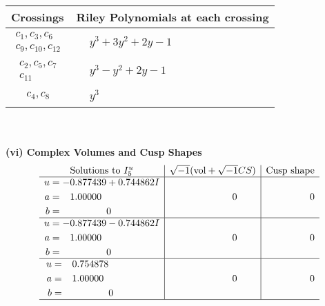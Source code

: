 \documentclass[1p]{elsarticle_modified}
\theoremstyle{definition}
\newcommand{\I}{\sqrt{-1}}
\begin{document}
\begin{tabular}{m{50pt}|m{274pt}}
Crossings & \hspace{64pt}Riley Polynomials at each crossing \\
\hline $$\begin{aligned}c_{1},c_{3},c_{6}\\c_{9},c_{10},c_{12}\end{aligned}$$&$\begin{aligned}
&y^3+3 y^2+2 y-1
\end{aligned}$\\
\hline $$\begin{aligned}c_{2},c_{5},c_{7}\\c_{11}\end{aligned}$$&$\begin{aligned}
&y^3- y^2+2 y-1
\end{aligned}$\\
\hline $$\begin{aligned}c_{4},c_{8}\end{aligned}$$&$\begin{aligned}
&y^3
\end{aligned}$\\
\hline
\end{tabular}\\~\\
\newpage\flushleft \textbf{(vi) Complex Volumes and Cusp Shapes}
$$\begin{array}{c|c|c}  
\text{Solutions to }I^u_{5}& \I (\text{vol} + \sqrt{-1}CS) & \text{Cusp shape}\\
 \hline 
\begin{aligned}
u &= -0.877439 + 0.744862 I \\
a &= \phantom{-}1.00000\phantom{ +0.000000I} \\
b &= \phantom{-0.000000 } 0\end{aligned}
 & \phantom{-0.000000 } 0 & \phantom{-0.000000 } 0 \\ \hline\begin{aligned}
u &= -0.877439 - 0.744862 I \\
a &= \phantom{-}1.00000\phantom{ +0.000000I} \\
b &= \phantom{-0.000000 } 0\end{aligned}
 & \phantom{-0.000000 } 0 & \phantom{-0.000000 } 0 \\ \hline\begin{aligned}
u &= \phantom{-}0.754878\phantom{ +0.000000I} \\
a &= \phantom{-}1.00000\phantom{ +0.000000I} \\
b &= \phantom{-0.000000 } 0\end{aligned}
 & \phantom{-0.000000 } 0 & \phantom{-0.000000 } 0\\
 \hline 
 \end{array}$$\newpage
\end{document}
